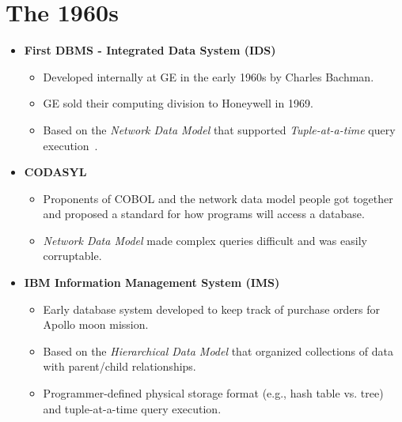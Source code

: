 \documentclass[11pt]{article}
\begin{document}
\section{The 1960s}
\begin{itemize}
    \item \textbf{First DBMS - Integrated Data System (IDS)}~\cite{bachman-interview,haigh16}
    \begin{itemize}
        \item
        Developed internally at GE in the early 1960s by Charles Bachman.
        
        \item
        GE sold their computing division to Honeywell in 1969.
        
        \item
        Based on the \textit{Network Data Model} that supported 
        \textit{Tuple-at-a-time} query execution~\cite{bachman66}.
    \end{itemize}
    
    \item \textbf{CODASYL}~\cite{taylor76}
    \begin{itemize}
        \item
        Proponents of COBOL and the network data model people got together and proposed a standard 
        for how programs will access a database.
        
        \item
        \textit{Network Data Model} made complex queries difficult and was easily corruptable.
    \end{itemize}
    
    \item \textbf{IBM Information Management System (IMS)}~\cite{klein12}
    \begin{itemize}
        \item
        Early database system developed to keep track of purchase orders for Apollo moon mission.
        
        \item
        Based on the \textit{Hierarchical Data Model} that organized collections of data with
        parent/child relationships.
        
        \item
        Programmer-defined physical storage format (e.g., hash table vs. tree) and tuple-at-a-time 
        query execution.
    \end{itemize}
\end{itemize}
\end{document}
